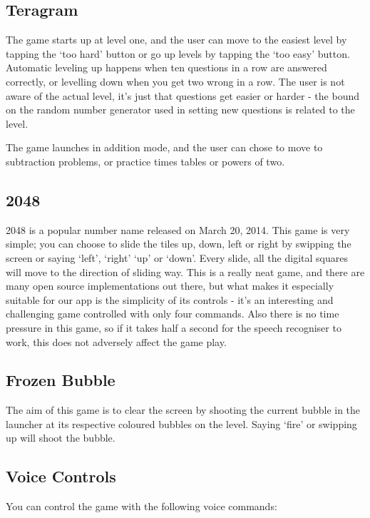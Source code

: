 \documentclass[11pt, oneside]{article}
\begin{document}
\subsection{Teragram}

The game starts up at level one, and the user can move to the easiest
level by tapping the `too hard' button or go up levels by tapping the
`too easy' button. Automatic leveling up happens when ten questions in
a row are answered correctly, or levelling down when you get two wrong
in a row. The user is not aware of the actual level, it's just that
questions get easier or harder - the bound on the random number
generator used in setting new questions is related to the level.

The game launches in addition mode, and the user can chose to move to
subtraction problems, or practice times tables or powers of two.

\subsection{2048}

2048 is a popular number name released on March 20, 2014. This game is
very simple; you can choose to slide the tiles up, down, left or right
by swipping the screen or saying `left', `right' `up' or `down'. Every
slide, all the digital squares will move to the direction of sliding
way. This is a really neat game, and there are many open source
implementations out there, but what makes it especially suitable for
our app is the simplicity of its controls - it's an interesting and
challenging game controlled with only four commands. Also there is no
time pressure in this game, so if it takes half a second for the
speech recogniser to work, this does not adversely affect the game
play.

\subsection{Frozen Bubble}
The aim of this game is to clear the screen by shooting the current
bubble in the launcher at its respective coloured bubbles on the
level. Saying `fire' or swipping up will shoot the bubble.

\subsection{Voice Controls}

You can control the game with the following voice commands:
\end{document}
